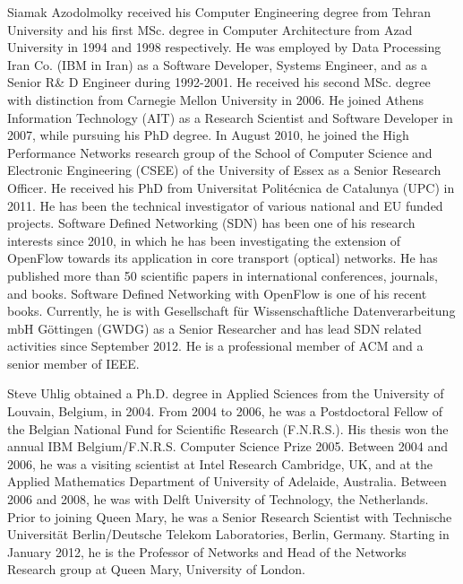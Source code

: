 \documentclass[journal]{IEEEtran}
\begin{document}
\begin{IEEEbiographynophoto}{Siamak Azodolmolky}
received his Computer Engineering degree from Tehran University and his first MSc. degree in Computer Architecture from Azad University in 1994 and 1998 respectively. He was employed by Data Processing Iran Co. (IBM in Iran) as a Software Developer, Systems Engineer, and as a Senior R\& D Engineer during 1992-2001. He received his second MSc. degree with distinction from Carnegie Mellon University in 2006. He joined Athens Information Technology (AIT) as a Research Scientist and Software Developer in 2007, while pursuing his PhD degree. In August 2010, he joined the High Performance Networks research group of the School of Computer Science and Electronic Engineering (CSEE) of the University of Essex as a Senior Research Officer. He received his PhD from Universitat Polit\'{e}cnica de Catalunya (UPC) in 2011. He has been the technical investigator of various national and EU funded projects. Software Defined Networking (SDN) has been one of his research interests since 2010, in which he has been investigating the extension of OpenFlow towards its application in core transport (optical) networks. He has published more than 50 scientific papers in international conferences, journals, and books. Software Defined Networking with OpenFlow is one of his recent books. Currently, he is with Gesellschaft f\"{u}r Wissenschaftliche Datenverarbeitung mbH G\"{o}ttingen (GWDG) as a Senior Researcher and has lead SDN related activities since September 2012. He is a professional member of ACM and a senior member of IEEE.
\end{IEEEbiographynophoto}

\begin{IEEEbiographynophoto}{Steve Uhlig} obtained a Ph.D. degree in Applied Sciences from the University of Louvain, Belgium, in 2004. From 2004 to 2006, he was a Postdoctoral Fellow of the Belgian National Fund for Scientific Research (F.N.R.S.). His thesis won the annual IBM Belgium/F.N.R.S. Computer Science Prize 2005. Between 2004 and 2006, he was a visiting scientist at Intel Research Cambridge, UK, and at the Applied Mathematics Department of University of Adelaide, Australia. Between 2006 and 2008, he was with Delft University of Technology, the Netherlands. Prior to joining Queen Mary, he was a Senior Research Scientist with Technische Universit\"{a}t Berlin/Deutsche Telekom Laboratories, Berlin, Germany. Starting in January 2012, he is the Professor of Networks and Head of the Networks Research group at Queen Mary, University of London.
\end{IEEEbiographynophoto}





\end{document}
